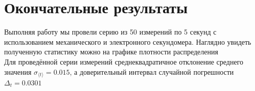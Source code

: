 \documentclass[12pt,a4paper]{article}
\begin{document}
\section{Окончательные результаты}
Выполняя работу мы провели серию из 50 измерений по 5 секунд с использованием механического и электронного секундомера. Наглядно увидеть полученную статистику можно на графике плотности распределения
\\\hfill\break
Для проведённой серии измерений среднеквадратичное отклонение среднего значения $\sigma_{\langle t\rangle}=0.015$, а доверительный интервал случайной погрешности $\Delta_t=0.0301$
\end{document}
